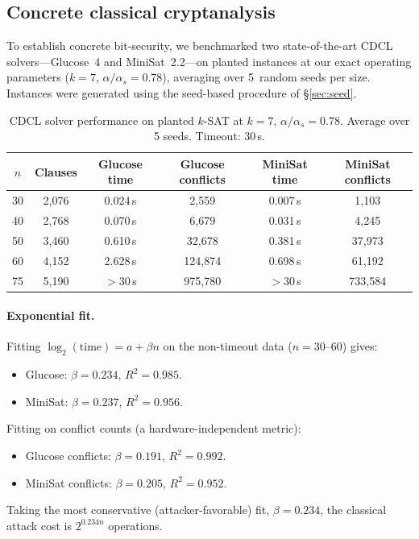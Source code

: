 \documentclass[11pt]{article}
\begin{document}
\subsection{Concrete classical cryptanalysis}\label{sec:concrete}

To establish concrete bit-security, we benchmarked two state-of-the-art CDCL solvers---Glucose~4 and MiniSat~2.2---on planted instances at our exact operating parameters ($k = 7$, $\alpha/\alpha_s = 0.78$), averaging over 5~random seeds per size.  Instances were generated using the seed-based procedure of \S\ref{sec:seed}.

\begin{table}[ht]
\centering
\caption{CDCL solver performance on planted $k$-SAT at $k = 7$, $\alpha/\alpha_s = 0.78$.  Average over 5 seeds.  Timeout: 30\,s.}\label{tab:cryptanalysis}
\begin{tabular}{@{}cccccc@{}}
\toprule
$n$ & Clauses & Glucose time & Glucose conflicts & MiniSat time & MiniSat conflicts \\
\midrule
30  & 2{,}076  & 0.024\,s     & 2{,}559   & 0.007\,s     & 1{,}103 \\
40  & 2{,}768  & 0.070\,s     & 6{,}679   & 0.031\,s     & 4{,}245 \\
50  & 3{,}460  & 0.610\,s     & 32{,}678  & 0.381\,s     & 37{,}973 \\
60  & 4{,}152  & 2.628\,s     & 124{,}874 & 0.698\,s     & 61{,}192 \\
75  & 5{,}190  & $> 30$\,s    & 975{,}780 & $> 30$\,s    & 733{,}584 \\
\bottomrule
\end{tabular}
\end{table}

\paragraph{Exponential fit.}
Fitting $\log_2(\text{time}) = a + \beta n$ on the non-timeout data ($n = 30$--$60$) gives:
\begin{itemize}
\item Glucose: $\beta = 0.234$, $R^2 = 0.985$.
\item MiniSat: $\beta = 0.237$, $R^2 = 0.956$.
\end{itemize}
Fitting on conflict counts (a hardware-independent metric):
\begin{itemize}
\item Glucose conflicts: $\beta = 0.191$, $R^2 = 0.992$.
\item MiniSat conflicts: $\beta = 0.205$, $R^2 = 0.952$.
\end{itemize}
Taking the most conservative (attacker-favorable) fit, $\beta = 0.234$, the classical attack cost is $2^{0.234n}$ operations.
\end{document}
